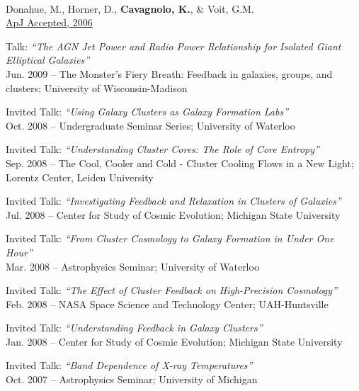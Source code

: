 \documentclass[12pt]{cv}
\begin{document}
\begin{llist}
{}\\
Donahue, M., Horner, D., {\bf Cavagnolo, K.}, \& Voit, G.M.\\
\href{http://adsabs.harvard.edu/abs/2006ApJ...643..730D}{ApJ Accepted, 2006}




{\sc Talk: {\textit{``The AGN Jet Power and Radio Power Relationship for Isolated Giant Elliptical Galaxies''}}}\\
Jun. 2009 -- The Monster's Fiery Breath: Feedback in galaxies, groups, and clusters; University of Wisconsin-Madison

{\sc Invited Talk: {\textit{``Using Galaxy Clusters as Galaxy Formation Labs''}}}\\
Oct. 2008 -- Undergraduate Seminar Series; University of Waterloo

{\sc Invited Talk: {\textit{``Understanding Cluster Cores: The Role of Core Entropy''}}}\\
Sep. 2008 -- The Cool, Cooler and Cold - Cluster Cooling Flows in a New Light; Lorentz Center, Leiden University

{\sc Invited Talk: {\textit{``Investigating Feedback and Relaxation in Clusters of Galaxies''}}}\\
Jul. 2008 -- Center for Study of Cosmic Evolution; Michigan State University

{\sc Invited Talk: {\textit{``From Cluster Cosmology to Galaxy Formation in Under One Hour''}}}\\
Mar. 2008 -- Astrophysics Seminar; University of Waterloo

{\sc Invited Talk: {\textit{``The Effect of Cluster Feedback on High-Precision Cosmology''}}}\\
Feb. 2008 -- NASA Space Science and Technology Center; UAH-Huntsville

{\sc Invited Talk: {\textit{``Understanding Feedback in Galaxy Clusters''}}}\\
Jan. 2008 -- Center for Study of Cosmic Evolution; Michigan State University

{\sc Invited Talk: {\textit{``Band Dependence of X-ray Temperatures''}}}\\
Oct. 2007 -- Astrophysics Seminar; University of Michigan


\end{llist}
\end{document}
